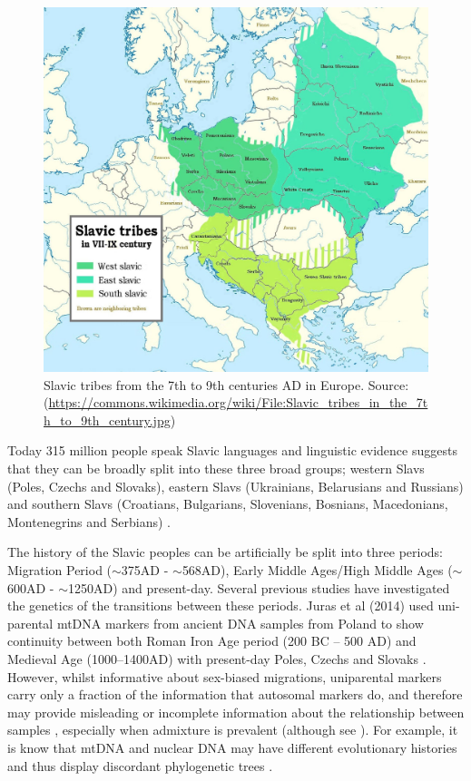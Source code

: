 \begin{figure}[htp]
    \centering
    \includegraphics[width=1.0\textwidth]{../images/chapter5/Slavic_tribes_in_the_7th_to_9th_century.jpg}
    \caption{Slavic tribes from the 7th to 9th centuries AD in Europe. Source: (\url{https://commons.wikimedia.org/wiki/File:Slavic_tribes_in_the_7th_to_9th_century.jpg})}
    \label{fig:Slavic_tribes}
\end{figure}

 Today 315 million people speak Slavic languages and linguistic evidence suggests that they can be broadly split into these three broad groups; western Slavs (Poles, Czechs and Slovaks), eastern Slavs (Ukrainians, Belarusians and Russians) and southern Slavs (Croatians, Bulgarians, Slovenians, Bosnians, Macedonians, Montenegrins and Serbians) \cite{sussex2006slavic}. 

The history of the Slavic peoples can be artificially be split into three periods: Migration Period ($\sim$375AD - $\sim$568AD), Early Middle Ages/High Middle Ages ($\sim$600AD - $\sim$1250AD) and present-day. Several previous studies have investigated the genetics of the transitions between these periods. Juras et al (2014) used uni-parental mtDNA markers from ancient DNA samples from Poland to show continuity between both Roman Iron Age period (200 BC – 500 AD) and Medieval Age (1000–1400AD) with present-day Poles, Czechs and Slovaks \cite{Juras2014}. However, whilst informative about sex-biased migrations, uniparental markers carry only a fraction of the information that autosomal markers do, and therefore may provide misleading or incomplete information about the relationship between  samples \cite{Shaw16122, malinsky2018whole}, especially when admixture is prevalent (although see \cite{Mitochondrial}). For example, it is know that mtDNA and nuclear DNA may have different evolutionary histories and thus display discordant phylogenetic trees \cite{posth2017deeply}. 

